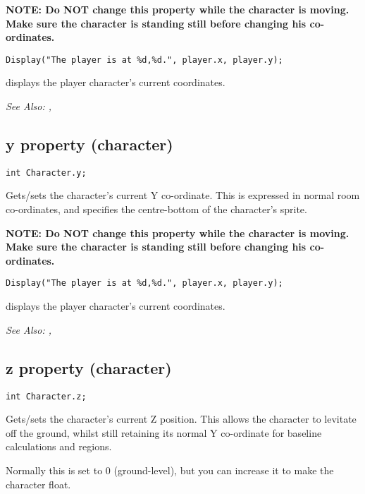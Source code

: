 \bf{NOTE:} Do \bf{NOT} change this property while the character is moving. Make
sure the character is standing still before changing his co-ordinates.

\begin{verbatim}
Display("The player is at %d,%d.", player.x, player.y);
\end{verbatim}
displays the player character's current coordinates.

\it{See Also:} ,


\subsection{y property (character)}\label{Character.y}%

\begin{verbatim}
int Character.y;
\end{verbatim}

Gets/sets the character's current Y co-ordinate. This is expressed in normal room
co-ordinates, and specifies the centre-bottom of the character's sprite.

\bf{NOTE:} Do \bf{NOT} change this property while the character is moving. Make
sure the character is standing still before changing his co-ordinates.

\begin{verbatim}
Display("The player is at %d,%d.", player.x, player.y);
\end{verbatim}
displays the player character's current coordinates.

\it{See Also:} ,


\subsection{z property (character)}\label{Character.z}%

\begin{verbatim}
int Character.z;
\end{verbatim}

Gets/sets the character's current Z position. This allows the character to levitate
off the ground, whilst still retaining its normal Y co-ordinate for baseline calculations
and regions.

Normally this is set to 0 (ground-level), but you can increase it to make the character float.

